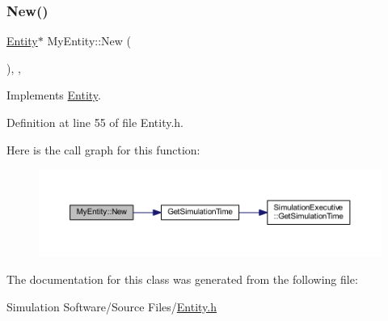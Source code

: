 \subsubsection{\texorpdfstring{New()}{New()}}
{\footnotesize\ttfamily \hyperlink{class_entity}{Entity}$\ast$ My\+Entity\+::\+New (\begin{DoxyParamCaption}{ }\end{DoxyParamCaption})\hspace{0.3cm}{\ttfamily [inline]}, {\ttfamily [override]}, {\ttfamily [virtual]}}



Implements \hyperlink{class_entity_ab8dc894a31d5c72219fa070345d7c383}{Entity}.



Definition at line 55 of file Entity.\+h.

Here is the call graph for this function\+:
\nopagebreak
\begin{figure}[H]
\begin{center}
\leavevmode
\includegraphics[width=350pt]{class_my_entity_acc29e753a0df1928eb4c9e627d65a3b3_cgraph}
\end{center}
\end{figure}


The documentation for this class was generated from the following file\+:\begin{DoxyCompactItemize}
\item 
Simulation Software/\+Source Files/\hyperlink{_entity_8h}{Entity.\+h}\end{DoxyCompactItemize}
